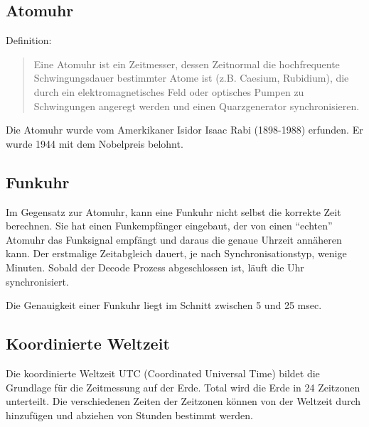 
\subsection{Atomuhr}
Definition:
\begin{quote}
Eine Atomuhr ist ein Zeitmesser, dessen Zeitnormal die hochfrequente Schwingungsdauer bestimmter Atome ist (z.B. Caesium, Rubidium), die durch ein elektromagnetisches Feld oder optisches Pumpen zu Schwingungen angeregt werden und einen Quarzgenerator synchronisieren.
\end{quote} %
Die Atomuhr wurde vom Amerkikaner Isidor Isaac Rabi (1898-1988) erfunden. Er wurde 1944 mit dem Nobelpreis belohnt.


\subsection{Funkuhr}
Im Gegensatz zur Atomuhr, kann eine Funkuhr nicht selbst die korrekte Zeit berechnen. Sie hat einen Funkempfänger eingebaut, der von einen "`echten"' Atomuhr das Funksignal empfängt und daraus die genaue Uhrzeit annäheren kann. Der erstmalige Zeitabgleich dauert, je nach Synchronisationstyp, wenige Minuten. Sobald der Decode Prozess abgeschlossen ist, läuft die Uhr synchronisiert.

Die Genauigkeit einer Funkuhr liegt im Schnitt zwischen 5 und 25 msec.


\subsection{Koordinierte Weltzeit}
Die koordinierte Weltzeit UTC (Coordinated Universal Time) bildet die Grundlage für die Zeitmessung auf der Erde. Total wird die Erde in 24 Zeitzonen unterteilt. Die verschiedenen Zeiten der Zeitzonen können von der Weltzeit durch hinzufügen und abziehen von Stunden bestimmt werden.

